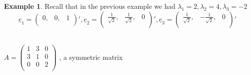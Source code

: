 \documentclass[11pt,a4paper]{article}
\theoremstyle{definition}
\newtheorem{exa}[thm]{Example}
\begin{document}
\begin{exa}
Recall that in the previous example we had $\lambda_1 = 2,  \lambda_2 = 4,  \lambda_3 = -2$
$$\underline{e}_1 = \begin{pmatrix}
0, & 0, & 1\\
\end{pmatrix}',  \underline{e}_2 = \begin{pmatrix}
\frac{1}{\sqrt{2}}, & \frac{1}{\sqrt{2}}, & 0\\
\end{pmatrix}',  \underline{e}_3 = \begin{pmatrix}
\frac{1}{\sqrt{2}}, & -\frac{1}{\sqrt{2}}, & 0\\
\end{pmatrix}'$$\\
\end{exa}


$A = \begin{pmatrix}
1 & 3 & 0\\
3 & 1 & 0\\
0 & 0 & 2\\
\end{pmatrix}$ , a symmetric matrix\\
\end{document}
